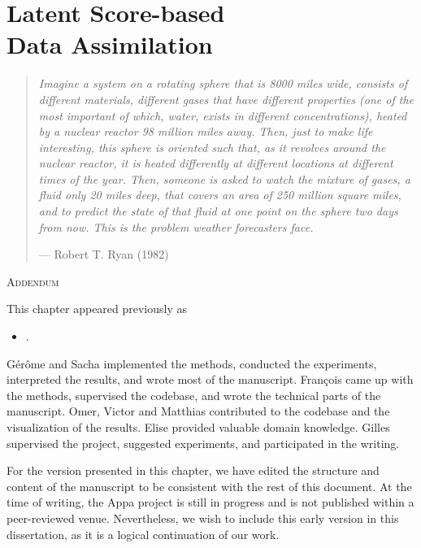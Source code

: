 \chapter[Latent Score-based Data Assimilation]{Latent Score-based\\Data Assimilation} \label{chap:appa}

\begin{quote}
    \textit{Imagine a system on a rotating sphere that is 8000 miles wide, consists of different materials, different gases that have different properties (one of the most important of which, water, exists in different concentrations), heated by a nuclear reactor 98 million miles away. Then, just to make life interesting, this sphere is oriented such that, as it revolves around the nuclear reactor, it is heated differently at different locations at different times of the year. Then, someone is asked to watch the mixture of gases, a fluid only 20 miles deep, that covers an area of 250 million square miles, and to predict the state of that fluid at one point on the sphere two days from now. This is the problem weather forecasters face.}

    \begin{flushright}
        --- Robert T. Ryan (1982) \nocite{ryan1982weather}
    \end{flushright}
\end{quote}

\vspace{2em}

\begin{addendum}{\Large\scshape Addendum}

This chapter appeared previously as

\begin{itemize}[leftmargin=1em]
    \item[] .
\end{itemize}

Gérôme and Sacha implemented the methods, conducted the experiments, interpreted the results, and wrote most of the manuscript. François came up with the methods, supervised the codebase, and wrote the technical parts of the manuscript. Omer, Victor and Matthias contributed to the codebase and the visualization of the results. Elise provided valuable domain knowledge. Gilles supervised the project, suggested experiments, and participated in the writing.

For the version presented in this chapter, we have edited the structure and content of the manuscript to be consistent with the rest of this document. At the time of writing, the Appa project is still in progress and is not published within a peer-reviewed venue. Nevertheless, we wish to include this early version in this dissertation, as it is a logical continuation of our work.

\end{addendum}

